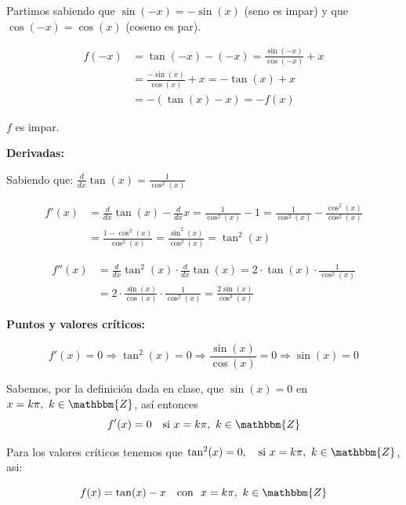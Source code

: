 \documentclass[12pt]{article}
\begin{document}
\begin{enumerate}[\hspace{9px} a)]
            Partimos sabiendo que \(\sin(-x)=-\sin(x)\) (seno es impar) y que \(\cos(-x)=\cos(x)\) (coseno es par).

            \begin{align*}
                f(-x)&=\tan(-x)-(-x)=\frac{\sin(-x)}{\cos(-x)}+x \\
                &= \frac{-\sin(x)}{\cos(x)}+x = -\tan(x)+x \\
                &= -(\tan(x)-x)= -f(x)
            \end{align*}

            $f$ es impar.\bigskip

        \textbf{Derivadas: }\medskip

            Sabiendo que: \(\displaystyle\frac{d}{dx}\tan(x) = \displaystyle\frac{1}{\cos^2(x)}\)

            \begin{align*}
                f'(x) &= \frac{d}{dx}\tan(x) - \frac{d}{dx}x = \frac{1}{\cos^2(x)} - 1 = \frac{1}{\cos^2(x)} - \frac{\cos^2(x)}{\cos^2(x)} \\
                &= \frac{1-\cos^2(x)}{\cos^2(x)} = \frac{\sin^2(x)}{\cos^2(x)} = \tan^2(x)
            \end{align*}

            \begin{align*}
                f''(x) &= \frac{d}{dx}\tan^2(x)\cdot\frac{d}{dx}\tan(x) = 2\cdot\tan(x)\cdot\frac{1}{\cos^2(x)} \\
                &= 2\cdot\frac{\sin(x)}{\cos(x)}\cdot\frac{1}{\cos^2(x)} = \frac{2\sin(x)}{\cos^3(x)}
            \end{align*}
            
        \textbf{Puntos y valores cr\'iticos: }\medskip

            \begin{equation*}
                f'(x)=0 \Longrightarrow \tan^2(x)=0 \Longrightarrow \frac{\sin(x)}{\cos(x)}=0 \Longrightarrow \sin(x)=0
            \end{equation*}

            Sabemos, por la definici\'on dada en clase, que \(\sin(x)=0\) en \(x=k\pi, \ k\in\mathbbm{Z}\), as\'i entonces 
            \[f'(x)=0 \quad \text{si} \ x=k\pi, \ k\in\mathbbm{Z}\]

            Para los valores cr\'iticos tenemos que \(\tan^2(x)=0, \quad \text{si} \ x=k\pi, \ k\in\mathbbm{Z}\), asi:

            \begin{equation*}
                f(x) = \tan(x)-x \quad \text{con } \  x=k\pi, \ k\in\mathbbm{Z}
            \end{equation*}


\end{enumerate}
\end{document}
